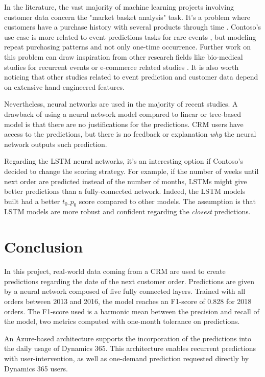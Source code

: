 In the literature, the vast majority of machine learning projects involving customer data concern the "market basket analysis" task. It's a problem where customers have a purchase history with several products through time \cite{temporal-feature}. Contoso's use case is more related to event predictions tasks for rare events \cite{7953302, Malhotra2015LongST}, but modeling repeat purchasing patterns and not only one-time occurrence. Further work on this problem can draw inspiration from other research fields like bio-medical studies for recurrent events \cite{biomedical-recurrent-events} or e-commerce related studies \cite{Liu:2016-repeat-buyer, Tian2015}. It is also worth noticing that other studies related to event prediction and customer data depend on extensive hand-engineered features.

Nevertheless, neural networks are used in the majority of recent studies. A drawback of using a neural network model compared to linear or tree-based model is that there are no justifications for the predictions. CRM users have access to the predictions, but there is no feedback or explanation \textit{why} the neural network outputs such prediction.

Regarding the LSTM neural networks, it's an interesting option if Contoso's decided to change the scoring strategy. For example, if the number of weeks until next order are predicted instead of the number of months, LSTMs might give better predictions than a fully-connected network. Indeed, the LSTM models built had a better $t_0\_p_0$ score compared to other models. The assumption is that LSTM models are more robust and confident regarding the \textit{closest} predictions.

\section{Conclusion} \label{sec:use-case-conclusion}
In this project, real-world data coming from a CRM are used to create predictions regarding the date of the next customer order. Predictions are given by a neural network composed of five fully connected layers. Trained with all orders between 2013 and 2016, the model reaches an F1-score of 0.828 for 2018 orders. The F1-score used is a harmonic mean between the precision and recall of the model, two metrics computed with one-month tolerance on predictions.

An Azure-based architecture supports the incorporation of the predictions into the daily usage of Dynamics 365. This architecture enables recurrent predictions with user-intervention, as well as one-demand prediction requested directly by Dynamics 365 users.